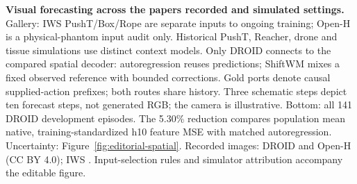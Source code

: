 \textbf{Visual forecasting across the paper\textquotesingle s recorded and simulated settings.} Gallery: IWS PushT/Box/Rope are separate inputs to ongoing training; Open-H is a physical-phantom input audit only. Historical PushT, Reacher, drone and tissue simulations use distinct context models. Only DROID connects to the compared spatial decoder: autoregression reuses predictions; ShiftWM mixes a fixed observed reference with bounded corrections. Gold ports denote causal supplied-action prefixes; both routes share history. Three schematic steps depict ten forecast steps, not generated RGB; the camera is illustrative. Bottom: all 141 DROID development episodes. The 5.30\% reduction compares population mean native, training-standardized h10 feature MSE with matched autoregression. Uncertainty: Figure~\ref{fig:editorial-spatial}. Recorded images: DROID and Open-H (CC BY 4.0); IWS \citep{zhang2026rlawm}. Input-selection rules and simulator attribution accompany the editable figure.
